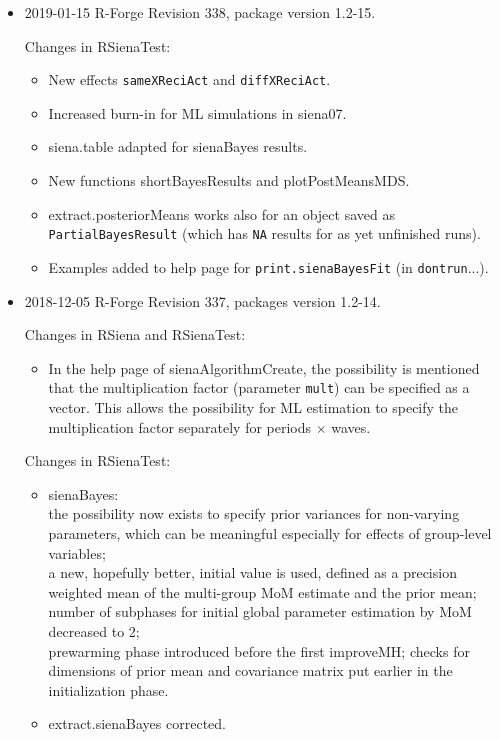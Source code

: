 \documentclass[a4paper,fleqn,11pt]{article}
\newcommand{\+}{\, + \,}
\newcommand{\sfn}[1]{\textsf{#1}}
\begin{document}
\begin{small}
\begin{itemize}
\begin{itemize}
\end{itemize}


\item 2019-01-15 R-Forge Revision 338, package version 1.2-15.

Changes in \textsf{RSienaTest}:
\begin{itemize}
    \item New effects \texttt{sameXReciAct} and \texttt{diffXReciAct}.
    \item Increased burn-in for ML simulations in \textsf{siena07}.
    \item \textsf{siena.table} adapted for \textsf{sienaBayes} results.
   \item  New functions \sfn{shortBayesResults} and \sfn{plotPostMeansMDS}.
   \item  \sfn{extract.posteriorMeans} works also for an object saved as \texttt{PartialBayesResult}
     (which has \texttt{NA} results for as yet unfinished runs).
   \item  Examples added to help page for \texttt{print.sienaBayesFit}
   (in \texttt{dontrun}...).
\end{itemize}

\item 2018-12-05 R-Forge Revision 337, packages version 1.2-14.

Changes in \textsf{RSiena} and \textsf{RSienaTest}:
\begin{itemize}
   \item In the help page of \textsf{sienaAlgorithmCreate}, the possibility is
   mentioned that the multiplication factor (parameter \texttt{mult}) can
   be specified as a vector.
   This allows the possibility for ML estimation to specify the
   multiplication factor separately for periods $\times$ waves.
\end{itemize}

Changes in \textsf{RSienaTest}:
\begin{itemize}
   \item \textsf{sienaBayes}:\\
     the possibility now exists to specify prior variances for non-varying
     parameters, which can be meaningful especially for effects of
     group-level variables;\\
     a new, hopefully better, initial value is used, defined as
     a precision weighted mean of the multi-group MoM estimate and the
     prior mean;\\
     number of subphases for initial global parameter estimation by MoM decreased
     to 2;\\
     prewarming phase introduced before the first \textsf{improveMH};
     checks for dimensions of prior mean and covariance matrix
     put earlier in the initialization phase.
   \item \textsf{extract.sienaBayes} corrected.
\end{itemize}


\end{itemize}
\end{small}
\end{document}
